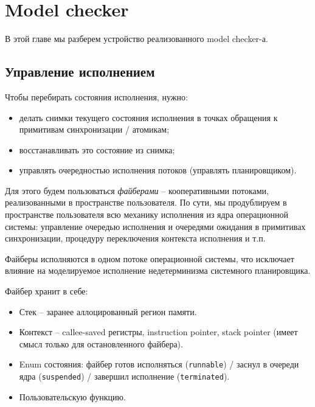 \chapter{Model checker}\label{ch:ch2}

В этой главе мы разберем устройство реализованного \autocite{CheckerRepo} model checker-а.

\section{Управление исполнением}

Чтобы перебирать состояния исполнения, нужно:

\begin{itemize}
\item	делать снимки текущего состояния исполнения в точках обращения к примитивам синхронизации / атомикам;

\item	восстанавливать это состояние из снимка;

\item	управлять очередностью исполнения потоков (управлять планировщиком).
\end{itemize}

Для этого будем пользоваться \emph{файберами} – кооперативными потоками, реализованными в пространстве пользователя. По сути, мы продублируем в пространстве пользователя всю механику исполнения из ядра операционной системы: управление очередью исполнения и очередями ожидания в примитивах синхронизации, процедуру переключения контекста исполнения и т.п.

Файберы исполняются в одном потоке операционной системы, что исключает влияние на моделируемое исполнение недетерминизма системного планировщика.

Файбер хранит в себе:

\begin{itemize}

\item	Стек – заранее аллоцированный регион памяти.

\item	Контекст – callee-saved регистры, instruction pointer, stack pointer (имеет смысл только для остановленного файбера).

\item	Enum состояния: файбер готов исполняться (\texttt{runnable}) / заснул в очереди ядра (\texttt{suspended}) / завершил исполнение (\texttt{terminated}).

\item	Пользовательскую функцию.

\end{itemize}

